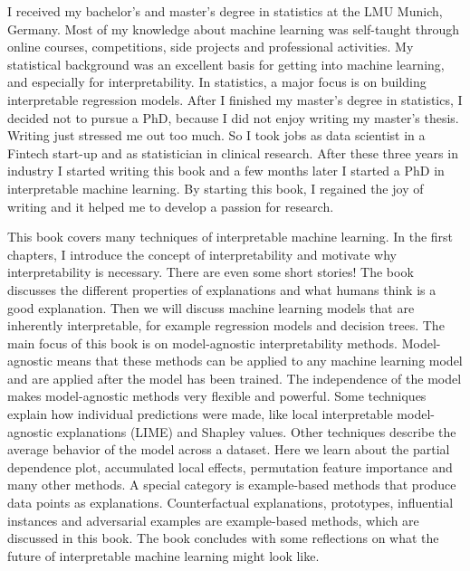 \documentclass[
  11pt,
]{scrbook}
\begin{document}
I received my bachelor's and master's degree in statistics at the LMU Munich, Germany.
Most of my knowledge about machine learning was self-taught through online courses, competitions, side projects and professional activities.
My statistical background was an excellent basis for getting into machine learning, and especially for interpretability.
In statistics, a major focus is on building interpretable regression models.
After I finished my master's degree in statistics, I decided not to pursue a PhD, because I did not enjoy writing my master's thesis.
Writing just stressed me out too much.
So I took jobs as data scientist in a Fintech start-up and as statistician in clinical research.
After these three years in industry I started writing this book and a few months later I started a PhD in interpretable machine learning.
By starting this book, I regained the joy of writing and it helped me to develop a passion for research.

This book covers many techniques of interpretable machine learning.
In the first chapters, I introduce the concept of interpretability and motivate why interpretability is necessary.
There are even some short stories!
The book discusses the different properties of explanations and what humans think is a good explanation.
Then we will discuss machine learning models that are inherently interpretable, for example regression models and decision trees.
The main focus of this book is on model-agnostic interpretability methods.
Model-agnostic means that these methods can be applied to any machine learning model and are applied after the model has been trained.
The independence of the model makes model-agnostic methods very flexible and powerful.
Some techniques explain how individual predictions were made, like local interpretable model-agnostic explanations (LIME) and Shapley values.
Other techniques describe the average behavior of the model across a dataset.
Here we learn about the partial dependence plot, accumulated local effects, permutation feature importance and many other methods.
A special category is example-based methods that produce data points as explanations.
Counterfactual explanations, prototypes, influential instances and adversarial examples are example-based methods, which are discussed in this book.
The book concludes with some reflections on what the future of interpretable machine learning might look like.
\end{document}
